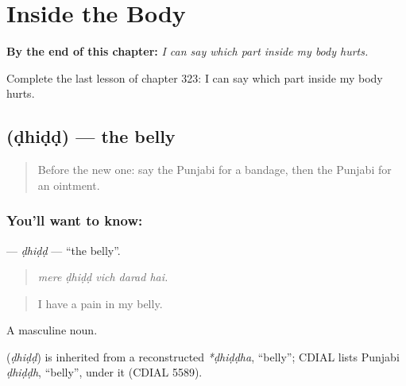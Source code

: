 
\chapter{Inside the Body}
\label{ch:pa-a2-inside-the-body}

\begin{chapteropening}
\textbf{By the end of this chapter:} \emph{I can say which part inside my body hurts.}

Complete the last lesson of chapter 323: I can say which part inside my body hurts.
\end{chapteropening}

\section[\texorpdfstring{\pa{ਢਿੱਡ} (ḍhiḍḍ)}{ਢਿੱਡ (ḍhiḍḍ)}]{ (ḍhiḍḍ) — the belly}

\label{lesson:PA-C323-dhidd}



\begin{quote}
Before the new one: say the Punjabi for a bandage, then the Punjabi for an ointment.
\end{quote}

\subsection*{You'll want to know: }
\textbf{} — \emph{ḍhiḍḍ} — \textquotedblleft{}the belly\textquotedblright{}.

\begin{quote}
    
\end{quote}

\begin{quote}
\emph{mere ḍhiḍḍ vich darad hai.}
\end{quote}

\begin{quote}
I have a pain in my belly.
\end{quote}

A masculine noun.

\begin{cousinweb}
\textbf{} (\emph{ḍhiḍḍ}) is inherited from a reconstructed \emph{*ḍhiḍḍha}, \textquotedblleft{}belly\textquotedblright{}; CDIAL lists Punjabi \emph{ḍhiḍḍh}, \textquotedblleft{}belly\textquotedblright{}, under it (CDIAL 5589).
\end{cousinweb}

